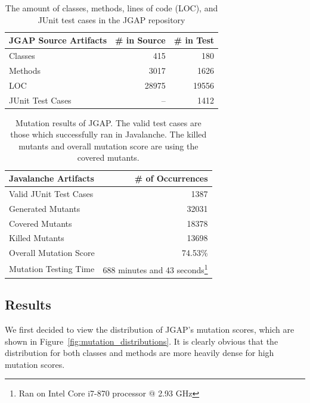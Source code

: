 \documentclass[conference]{IEEEtran}
\begin{document}
\begin{table}[!t]
  \centering
  \begin{tabular}{|l|r|r|}
    \hline
    \rowcolor[RGB]{169,196,223}
    \textbf{JGAP Source Artifacts} & \textbf{\# in Source} & \textbf{\# in Test} \\
    \hline Classes & 415 & 180 \\
    \hline Methods & 3017 & 1626 \\
    \hline LOC & 28975 & 19556 \\
    \hline JUnit Test Cases & -- & 1412\footnotemark[6] \\
    \hline
  \end{tabular}
  \caption{The amount of classes, methods, lines of code (LOC), and JUnit test cases in the JGAP repository}
  \label{tab:jgap_source_stats}
\end{table}

\begin{table}[!t]
  \centering
  \begin{tabular}{|l|r|}
    \hline
    \rowcolor[RGB]{169,196,223}
    \textbf{Javalanche Artifacts} & \textbf{\# of Occurrences} \\
    \hline Valid JUnit Test Cases & 1387\footnotemark[6] \\
    \hline Generated Mutants & 32031 \\
    \hline Covered Mutants & 18378 \\
    \hline Killed Mutants & 13698 \\
    \hline Overall Mutation Score & 74.53\% \\
    \hline Mutation Testing Time & 688 minutes and 43 seconds\footnote{Ran on Intel Core i7-870 processor @ 2.93 GHz} \\
    \hline
  \end{tabular}
  \caption{Mutation results of JGAP. The valid test cases are those which successfully ran in Javalanche. The killed mutants and overall mutation score are using the covered mutants.}
  \label{tab:jgap_mutation_stats}
\end{table}


\subsection{Results}
\label{subsec:results}
We first decided to view the distribution of JGAP's mutation scores, which are shown in Figure~\ref{fig:mutation_distributions}. It is clearly obvious that the distribution for both classes and methods are more heavily dense for high mutation scores. 
\end{document}
